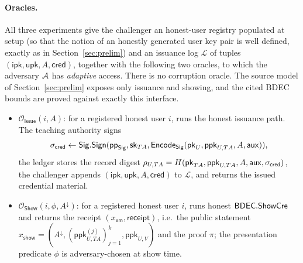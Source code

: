 \paragraph{Oracles.}
All three experiments give the challenger an honest-user registry populated at setup (so that the notion of an honestly generated user key pair is well defined, exactly as in Section~\ref{sec:prelim}) and an issuance log $\mathcal L$ of tuples $(\mathsf{ipk},\mathsf{upk},A,\mathsf{cred})$, together with the following two oracles, to which the adversary $\mathcal{A}$ has \emph{adaptive} access. There is no corruption oracle. The source model of Section~\ref{sec:prelim} exposes only issuance and showing, and the cited BDEC bounds are proved against exactly this interface.
\begin{itemize}
    \item $\mathcal O_{\mathsf{Issue}}(i,A)$: for a registered honest user $i$, runs the honest issuance path. The teaching authority signs
    \begin{equation*}\sigma_{\mathsf{cred}}\leftarrow\mathsf{Sig}.\mathsf{Sign}(\mathsf{pp}_{\mathsf{Sig}},\mathsf{sk}_{TA},\mathsf{Encode}_{\mathsf{Sig}}(\mathsf{pk}_U,\mathsf{ppk}_{U,TA},A,\mathsf{aux})),\end{equation*}
    the ledger stores the record digest $\rho_{U,TA}=H(\mathsf{pk}_{TA},\mathsf{ppk}_{U,TA},A,\mathsf{aux},\sigma_{\mathsf{cred}})$, the challenger appends $(\mathsf{ipk},\mathsf{upk},A,\mathsf{cred})$ to $\mathcal L$, and returns the issued credential material.
    \item $\mathcal O_{\mathsf{Show}}(i,\phi,A^\downarrow)$: for a registered honest user $i$, runs honest $\mathsf{BDEC}.\mathsf{ShowCre}$ and returns the receipt $(x_{\mathsf{vm}},\mathsf{receipt})$, i.e.\ the public statement $x_{\mathsf{show}}=(A^\downarrow,(\mathsf{ppk}_{U,TA}^{(j)})_{j=1}^{k},\mathsf{ppk}_{U,V})$ and the proof $\pi$; the presentation predicate $\phi$ is adversary-chosen at show time.
\end{itemize}

